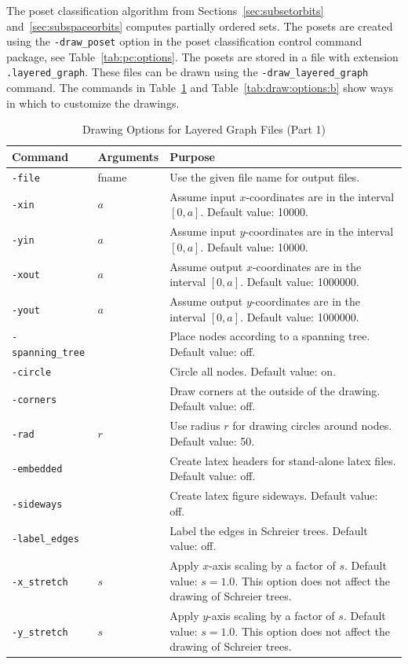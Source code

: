 The poset classification algorithm from Sections~\ref{sec:subsetorbits} 
and~\ref{sec:subspaceorbits} computes partially ordered sets. 
The posets are created using the \verb'-draw_poset' option in 
the poset classification control command package, see Table~\ref{tab:pc:options}. 
The posets are stored in a file with extension \verb'.layered_graph'.
These files can be drawn using the \verb'-draw_layered_graph' command.
The commands in Table~\ref{tab:draw:options} and Table~\ref{tab:draw:options:b} 
show ways in which to customize the drawings.
\begin{table}
\begin{center}
	\begin{tabular}{|p{4cm}|p{3cm}|p{7cm}|}
\hline
Command & Arguments & Purpose \\
\hline
\verb'-file' &  fname  & Use the given file name for output files. \\
\hline
\verb'-xin' &  $a$  & Assume input $x$-coordinates are in the interval $[0,a]$. Default value: 10000. \\
\hline
\verb'-yin' &  $a$  & Assume input $y$-coordinates are in the interval $[0,a]$. Default value: 10000. \\
\hline
\verb'-xout' &  $a$  & Assume output $x$-coordinates are in the interval $[0,a]$. Default value: 1000000. \\
\hline
\verb'-yout' &  $a$  & Assume output $y$-coordinates are in the interval $[0,a]$. Default value: 1000000. \\
\hline
\verb'-spanning_tree' &   & Place nodes according to a spanning tree. Default value: off.\\
\hline
\verb'-circle' &   & Circle all nodes. Default value: on.\\
\hline
\verb'-corners' &   & Draw corners at the outside of the drawing. Default value: off.\\
\hline
\verb'-rad' & $r$  & Use radius $r$ for drawing circles around nodes. Default value: 50.\\
\hline
\verb'-embedded' &   & Create latex headers for stand-alone latex files. Default value: off. \\
\hline
\verb'-sideways' &   & Create latex figure sideways. Default value: off.\\
\hline
\verb'-label_edges' &   & Label the edges in Schreier trees. Default value: off. \\
\hline
\verb'-x_stretch' & $s$  & Apply $x$-axis scaling by a factor of $s$. Default value: $s=1.0$. 
This option does not affect the drawing of Schreier trees.\\
\hline
\verb'-y_stretch' & $s$  & Apply $y$-axis scaling by a factor of $s$. Default value: $s=1.0$. 
This option does not affect the drawing of Schreier trees.\\
\hline
\end{tabular}
\end{center}
\caption{\label{tab:draw:options}Drawing Options for Layered Graph Files (Part 1)}
\end{table}
